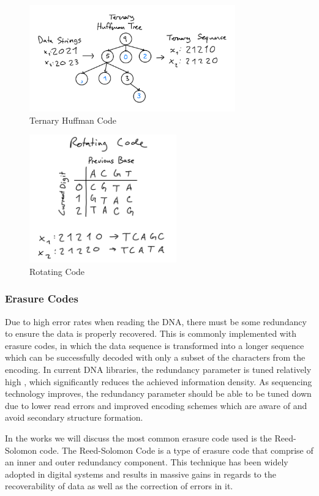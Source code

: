 \documentclass[a4paper,conference]{IEEEtran}
\begin{document}
\begin{figure}
\centering
\includegraphics[width=3.5in]{huffman}
\caption{Ternary Huffman Code}
\label{code}
\end{figure}
\begin{figure}
\centering
\includegraphics[width=2.5in]{rotatingcode}
\caption{Rotating Code}
\label{code}
\end{figure}

\subsubsection{Erasure Codes}
Due to high error rates when reading the DNA, there must be some redundancy to ensure the data is properly recovered. This is commonly implemented with erasure codes, in which the data sequence is transformed into a longer sequence which can be successfully decoded with only a subset of the characters from the encoding. In current DNA libraries, the redundancy parameter is tuned relatively high \cite{}, which significantly reduces the achieved information density. As sequencing technology improves, the redundancy parameter should be able to be tuned down \cite{} due to lower read errors and improved encoding schemes which are aware of and avoid secondary structure formation.

In the works we will discuss the most common erasure code used is the Reed-Solomon code. The Reed-Solomon Code is a type of erasure code that comprise of an inner and outer redundancy component. This technique has been widely adopted in digital systems and results in massive gains in regards to the recoverability of data as well as the correction of errors in it.
\end{document}
